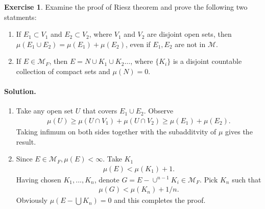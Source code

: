 \documentclass[10pt,a4paper]{book}
\theoremstyle{definition}
\newtheorem{exercise}{Exercise}[chapter]
\begin{document}
	\begin{exercise}
		Examine the proof of Riesz theorem and prove the following two statments:
		\begin{enumerate}
			\item If $ E_1 \subset V_1 $ and $ E_2 \subset V_2 $, where $ V_1 $ and $ V_2 $ are disjoint open sets, then $ \mu(E_1 \cup E_2) = \mu(E_1) + \mu(E_2) $, even if $ E_1, E_2 $ are not in $ \mathcal{M} $.
			\item If $ E \in \mathcal{M}_F $, then $ E = N \cup K_1 \cup K_2 \dots $, where $ \{K_i\} $ is a disjoint countable collection of compact sets and $ \mu(N) = 0 $.
		\end{enumerate}

		\paragraph{Solution. }
		\begin{enumerate}
			\item Take any open set $ U $ that covers $ E_1 \cup E_2 $. Observe
			\begin{align*}
				\mu(U) \ge \mu(U \cap V_1) + \mu(U \cap V_2) \ge \mu(E_1) + \mu(E_2).
			\end{align*}
			Taking infimum on both sides together with the subadditvity of $ \mu $ gives the result.

			\item Since $ E \in \mathcal{M}_F, \mu(E) < \infty $. Take $ K_1 $
			\begin{align*}
				\mu(E) < \mu(K_1) + 1.
			\end{align*}
			Having chosen $ K_1, ..., K_n $, denote $ G = E - \cup ^{n-1} K_i \in \mathcal{M}_F$. Pick $ K_n $ such that
			\begin{align*}
				 \mu(G) < \mu(K_n) + 1/n .
			\end{align*}
		 	Obviously $ \mu(E - \bigcup K_n) = 0 $ and this completes the proof.


		\end{enumerate}
	\end{exercise}
\end{document}
